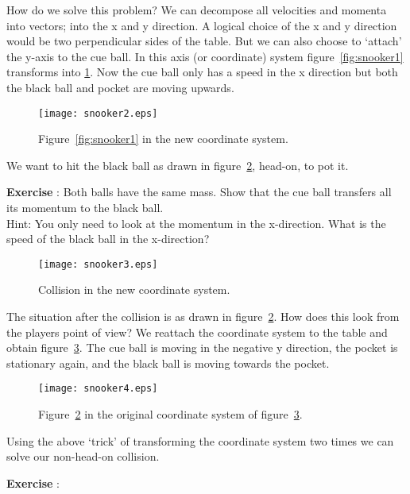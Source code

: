 How do we solve this problem? We can decompose all velocities and momenta into vectors; into the x and y direction. A logical choice of the x and y direction would be two perpendicular sides of the table. But we can also choose to `attach' the y-axis to the cue ball. In this axis (or coordinate) system figure~\ref{fig:snooker1} transforms into \ref{fig:snooker2}. Now the cue ball only has a speed in the x direction but both the black ball and pocket are moving upwards.

\begin{figure}[h]\begin{center}
\texttt{[image: snooker2.eps]}%
\caption{Figure~\ref{fig:snooker1} in the new coordinate system.}\label{fig:snooker2}
\end{center}\end{figure}

We want to hit the black ball as drawn in figure~\ref{fig:snooker3}, head-on, to pot it. 
\begin{shaded}
\textbf{Exercise \theExercise {}} : Both balls have the same mass. Show that the cue ball transfers all its momentum to the black ball.\\
Hint: You only need to look at the momentum in the x-direction. What is the speed of the black ball in the x-direction?
\end{shaded}

\begin{figure}\begin{center}
\texttt{[image: snooker3.eps]}%
\caption{Collision in the new coordinate system.}\label{fig:snooker3}
\end{center}\end{figure}

The situation after the collision is as drawn in figure~\ref{fig:snooker3}. How does this look from the players point of view? We reattach the coordinate system to the table and obtain figure~\ref{fig:snooker4}. The cue ball is moving in the negative y direction, the pocket is stationary again, and the black ball is moving towards the pocket. 

\begin{figure}\begin{center}
\texttt{[image: snooker4.eps]}%
\caption{Figure~\ref{fig:snooker3} in the original coordinate system of figure~\ref{fig:snooker4}.}\label{fig:snooker4}
\end{center}\end{figure}

Using the above `trick' of transforming the coordinate system two times we can solve our non-head-on collision.




\begin{shaded}
\textbf{Exercise \theExercise {}} : \end{shaded}

\footnotemark
\footnotetext{}
